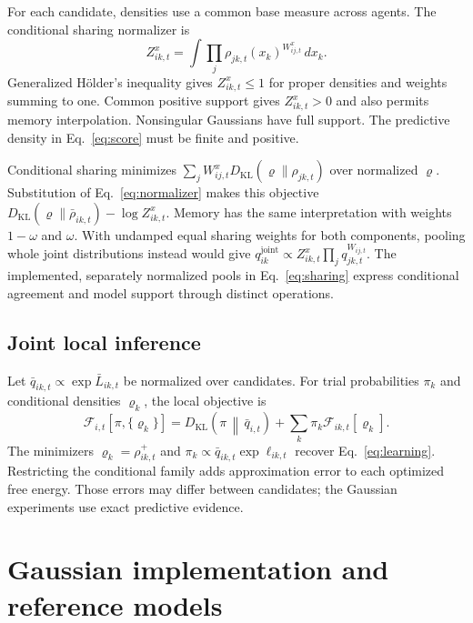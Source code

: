 \documentclass[runningheads]{llncs}
\newcommand{\KL}[2]{D_{\mathrm{KL}}\!\left(#1\,\middle\|\,#2\right)}
\begin{document}
For each candidate, densities use a common base measure across agents. The
conditional sharing normalizer is
\begin{equation}
 Z^x_{ik,t}=\int\prod_j\rho_{jk,t}(x_k)^{W^x_{ij,t}}\,dx_k.
 \label{eq:normalizer}
\end{equation}
Generalized H\"older's inequality gives $Z^x_{ik,t}\leq1$ for proper densities
and weights summing to one. Common positive support gives $Z^x_{ik,t}>0$ and
also permits memory interpolation. Nonsingular Gaussians have full support.
The predictive density in Eq.~\eqref{eq:score} must be finite and positive.

Conditional sharing minimizes
$\sum_jW^x_{ij,t}D_{\mathrm{KL}}(\varrho\|\rho_{jk,t})$ over normalized
$\varrho$. Substitution of Eq.~\eqref{eq:normalizer} makes this objective
$D_{\mathrm{KL}}(\varrho\|\bar\rho_{ik,t})-\log Z^x_{ik,t}$.
Memory has the same interpretation with weights $1-\omega$ and $\omega$.
With undamped equal sharing weights for both components, pooling whole joint
distributions instead would give
$q^{\mathrm{joint}}_{ik}\propto Z^x_{ik,t}\prod_jq_{jk,t}^{W_{ij,t}}$.
The implemented, separately normalized pools in Eq.~\eqref{eq:sharing} express
conditional agreement and model support through distinct operations.

\subsection{Joint local inference}
Let $\bar q_{ik,t}\propto\exp\bar L_{ik,t}$ be normalized over candidates.
For trial probabilities $\pi_k$ and conditional densities $\varrho_k$, the
local objective is
\begin{equation}
 \mathcal F_{i,t}[\pi,\{\varrho_k\}]
   =\KL{\pi}{\bar q_{i,t}}+\sum_k\pi_k\mathcal F_{ik,t}[\varrho_k].
 \label{eq:joint-free-energy}
\end{equation}
The minimizers $\varrho_k=\rho^+_{ik,t}$ and
$\pi_k\propto\bar q_{ik,t}\exp\ell_{ik,t}$ recover Eq.~\eqref{eq:learning}.
Restricting the conditional family adds approximation error to each optimized
free energy. Those errors may differ between candidates; the Gaussian experiments
use exact predictive evidence.

\section{Gaussian implementation and reference models}
\label{app:gaussian}
\end{document}
